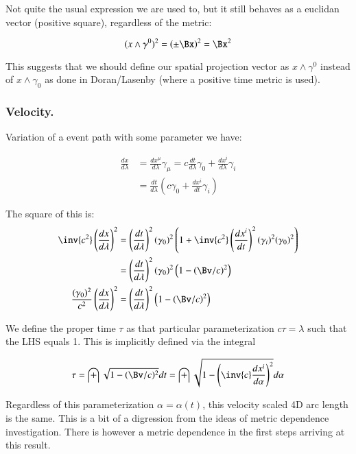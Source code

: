 \documentclass{article}
\begin{document}
Not quite the usual expression we are used to, but it still behaves as a euclidan vector (positive square), regardless of the metric:

\begin{equation*}
(x \wedge \gamma^0)^2 = \left(\pm \Bx\right)^2 = \Bx^2
\end{equation*}

This suggests that we should define our spatial projection vector as $x \wedge \gamma^0$ instead of $x \wedge \gamma_0$ as done in
Doran/Lasenby (where a positive time metric is used).

\subsubsection{ Velocity. }

Variation of a event path with some parameter we have:

\begin{align*}
\frac{ d x }{ d \lambda }
&= \frac{ d x^{\mu} }{ d \lambda } \gamma_{\mu} = c \frac{dt}{d\lambda} \gamma_0 + \frac{d x^i }{d\lambda} \gamma_i \\
&= \frac{d t}{d \lambda} \left( c \gamma_0 + \frac{d x^i }{dt} \gamma_i \right)
\end{align*}

The square of this is:
\begin{align*}
\inv{c^2} \left(\frac{ d x }{ d \lambda } \right)^2
&= \left(\frac{dt }{d\lambda}\right)^2 (\gamma_0)^2 \left( 1 + \inv{c^2}\left(\frac{d x^i }{dt}\right)^2 (\gamma_i)^2 (\gamma_0)^2 \right) \\
&= \left(\frac{d t}{d \lambda}\right)^2 (\gamma_0)^2 \left( 1 - (\Bv/c)^2 \right) \\
\frac{ (\gamma_0)^2 }{c^2} \left(\frac{ d x }{ d \lambda } \right)^2 &= \left(\frac{d t}{d \lambda}\right)^2 \left( 1 - (\Bv/c)^2 \right) \\
\end{align*}

We define the proper time $\tau$ as that particular parameterization $c \tau = \lambda$ such that the LHS equals 1.  This is implicitly defined
via the integral

\begin{equation*}
\tau = \int \sqrt{ 1 - (\Bv/c)^2 } dt = \int \sqrt{ 1 - \left(\inv{c} \frac{dx^i }{d \alpha} \right)^2 } d\alpha
\end{equation*}

Regardless of this parameterization $\alpha = \alpha(t)$, this velocity scaled 4D arc length is the same.  This is a bit of a digression from the
ideas of metric dependence investigation.  There is however a metric dependence in the first steps arriving at this result.
\end{document}
